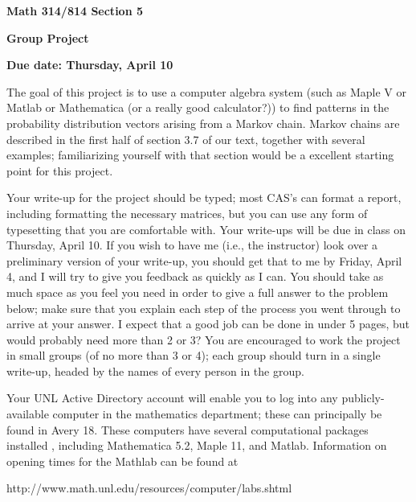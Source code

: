 
\nopagenumbers
\parindent=0pt

\def\ssk{\smallskip}
\def\msk{\medskip}
\def\bsk{\bigskip}

\centerline{\bf Math 314/814 Section 5}

\centerline{\bf Group Project}

\centerline{\bf Due date: Thursday, April 10}

\bigskip

The goal of this project is to use a computer algebra system (such as Maple V or Matlab
or Mathematica (or a really good calculator?))
to find patterns in the probability distribution vectors arising from a Markov chain. 
Markov chains are described in the first half of section 3.7 of our text, together
with several examples; familiarizing yourself with that section would be a excellent starting point
for this project.

\medskip

Your write-up for the project should be typed; most CAS's can format a report,
including formatting the necessary matrices, but you can use any form of typesetting
that you are comfortable with.
Your write-ups will be due in class on Thursday, April 10. If you wish to have me 
(i.e., the
instructor) look over a preliminary version of your write-up, you should get that to me 
by Friday, April 4, and I will try to give you feedback as quickly as I can.
You should take as much space as you feel you need in order to give a full answer to the problem 
below; make sure that you explain each step of the process you went through to arrive 
at your answer. I expect that a good job can be done in under 5 pages, but would 
probably need more than 2 or 3? You are encouraged to work the project in small
groups (of no more than 3 or 4); each group should turn in a single write-up, headed
by the names of every person in the group. 

\medskip

Your UNL Active Directory account will enable you to log into any publicly-available
computer in the mathematics department; these can principally be found in Avery 18.
These computers have several computational packages installed , including Mathematica 5.2,
Maple 11, and Matlab. Information on opening times for the Mathlab can be found at

\msk

http://www.math.unl.edu/resources/computer/labs.shtml

\msk

